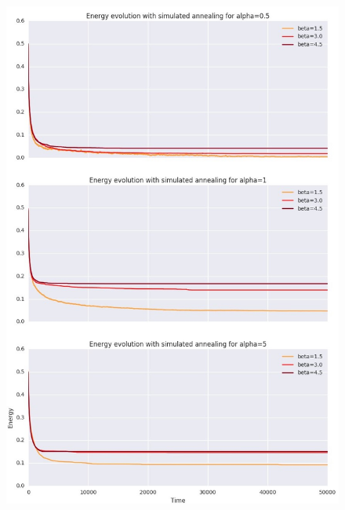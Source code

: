\documentclass[twocolumn]{article}
\begin{document}
\begin{figure}
	\includegraphics[width=\columnwidth]{../tobekept/skype_2.jpg}
\end{figure}
\end{document}
